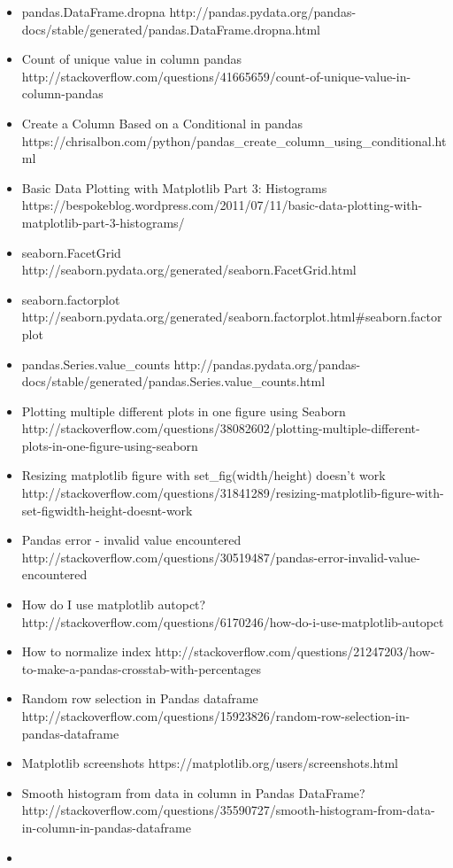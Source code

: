\documentclass[11pt]{article}
\begin{document}
\begin{itemize}
\item
  pandas.DataFrame.dropna
  http://pandas.pydata.org/pandas-docs/stable/generated/pandas.DataFrame.dropna.html
\item
  Count of unique value in column pandas
  http://stackoverflow.com/questions/41665659/count-of-unique-value-in-column-pandas
\item
  Create a Column Based on a Conditional in pandas
  https://chrisalbon.com/python/pandas\_create\_column\_using\_conditional.html
\item
  Basic Data Plotting with Matplotlib Part 3: Histograms
  https://bespokeblog.wordpress.com/2011/07/11/basic-data-plotting-with-matplotlib-part-3-histograms/
\item
  seaborn.FacetGrid
  http://seaborn.pydata.org/generated/seaborn.FacetGrid.html
\item
  seaborn.factorplot
  http://seaborn.pydata.org/generated/seaborn.factorplot.html\#seaborn.factorplot
\item
  pandas.Series.value\_counts
  http://pandas.pydata.org/pandas-docs/stable/generated/pandas.Series.value\_counts.html
\item
  Plotting multiple different plots in one figure using Seaborn
  http://stackoverflow.com/questions/38082602/plotting-multiple-different-plots-in-one-figure-using-seaborn
\item
  Resizing matplotlib figure with set\_fig(width/height) doesn't work
  http://stackoverflow.com/questions/31841289/resizing-matplotlib-figure-with-set-figwidth-height-doesnt-work
\item
  Pandas error - invalid value encountered
  http://stackoverflow.com/questions/30519487/pandas-error-invalid-value-encountered
\item
  How do I use matplotlib autopct?
  http://stackoverflow.com/questions/6170246/how-do-i-use-matplotlib-autopct
\item
  How to normalize index
  http://stackoverflow.com/questions/21247203/how-to-make-a-pandas-crosstab-with-percentages
\item
  Random row selection in Pandas dataframe
  http://stackoverflow.com/questions/15923826/random-row-selection-in-pandas-dataframe
\item
  Matplotlib screenshots https://matplotlib.org/users/screenshots.html
\item
  Smooth histogram from data in column in Pandas DataFrame?
  http://stackoverflow.com/questions/35590727/smooth-histogram-from-data-in-column-in-pandas-dataframe
\item

\end{itemize}
\end{document}
